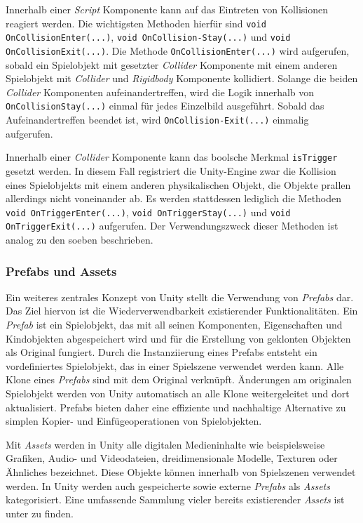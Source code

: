 Innerhalb einer \textit{Script} Komponente kann auf das Eintreten von Kollisionen reagiert werden.  Die wichtigsten Methoden hierfür sind \texttt{void OnCollisionEnter(...)}, \texttt{void OnCollision-\linebreak Stay(...)} und \texttt{void OnCollisionExit(...)}. Die Methode \texttt{OnCollisionEnter(...)} wird aufgerufen, sobald ein Spielobjekt mit gesetzter \textit{Collider} Komponente mit einem anderen Spielobjekt mit \textit{Collider} und \textit{Rigidbody} Komponente kollidiert. Solange die beiden \textit{Collider} Komponenten aufeinandertreffen, wird die Logik innerhalb von \texttt{OnCollisionStay(...)} einmal für jedes Einzelbild ausgeführt. Sobald das Aufeinandertreffen beendet ist, wird \texttt{OnCollision-\linebreak Exit(...)} einmalig aufgerufen. 

Innerhalb einer \textit{Collider} Komponente kann das boolsche Merkmal \texttt{isTrigger} gesetzt werden. In diesem Fall registriert die Unity-Engine zwar die Kollision eines Spielobjekts mit einem anderen physikalischen Objekt, die Objekte prallen allerdings nicht voneinander ab. Es werden stattdessen lediglich die Methoden \texttt{void OnTriggerEnter(...)}, \texttt{void OnTriggerStay(...)} und \texttt{void OnTriggerExit(...)} aufgerufen. Der Verwendungszweck dieser Methoden ist analog zu den soeben beschrieben. 

\subsubsection{Prefabs und Assets}\label{sec:unityPrefabsAndAssets}

Ein weiteres zentrales Konzept von Unity stellt die Verwendung von \textit{Prefabs} dar. Das Ziel hiervon ist die Wiederverwendbarkeit existierender Funktionalitäten. Ein \textit{Prefab} ist ein Spielobjekt, das mit all seinen Komponenten, Eigenschaften und Kindobjekten abgespeichert wird und für die Erstellung von geklonten Objekten als Original fungiert. Durch die Instanziierung eines Prefabs entsteht ein vordefiniertes Spielobjekt, das in einer Spielszene verwendet werden kann. Alle Klone eines \textit{Prefabs} sind mit dem Original verknüpft. Änderungen am originalen Spielobjekt werden von Unity automatisch an alle Klone weitergeleitet und dort aktualisiert. Prefabs bieten daher eine effiziente und nachhaltige Alternative zu simplen Kopier- und Einfügeoperationen von Spielobjekten. 

Mit \textit{Assets} werden in Unity alle digitalen Medieninhalte wie beispielsweise Grafiken, Audio- und Videodateien, dreidimensionale Modelle, Texturen oder Ähnliches bezeichnet. Diese Objekte können innerhalb von Spielszenen verwendet werden. In Unity werden auch gespeicherte sowie externe \textit{Prefabs} als \textit{Assets} kategorisiert. Eine umfassende Sammlung vieler bereits existierender \textit{Assets} ist unter \cite{Unity_Doc_Assets_Bib} zu finden. 

